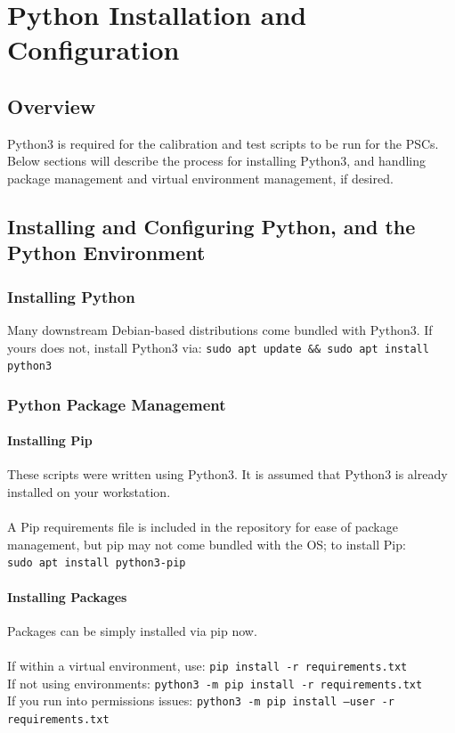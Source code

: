 
\chapter{Python Installation and Configuration}
\label{chap:Python Installation and Configuration}
\section{Overview}
Python3 is required for the calibration and test scripts to be run for the PSCs. Below sections will describe the process for installing Python3, and handling package management and virtual environment management, if desired. 

\section{Installing and Configuring Python, and the Python Environment}
\subsection{Installing Python}
Many downstream Debian-based distributions come bundled with Python3. If yours does not, install Python3 via: \texttt{sudo apt update \&\& sudo apt install python3}

\subsection{Python Package Management}
\subsubsection*{Installing Pip}
These scripts were written using Python3. It is assumed that Python3 is already installed on your workstation.\\\\
A Pip requirements file is included in the repository for ease of package management, but pip may not come bundled with the OS; to install Pip:\\
\texttt{sudo apt install python3-pip}

\subsubsection*{Installing Packages}
Packages can be simply installed via pip now.\\\\
If within a virtual environment, use: \texttt{pip install -r requirements.txt}\\
If not using environments: \texttt{python3 -m pip install -r requirements.txt}\\
If you run into permissions issues: \texttt{python3 -m pip install --user -r requirements.txt}


